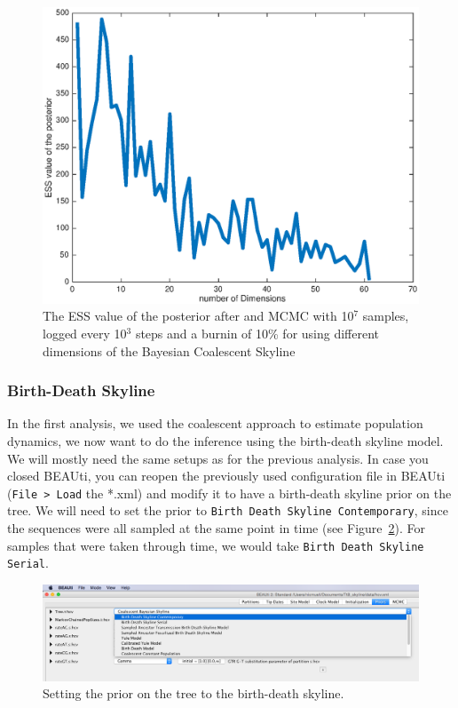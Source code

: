 \documentclass[11pt]{article}
\begin{document}
\begin{figure}[h!]
\centering
\includegraphics[scale=0.5]{figures/ess_vs_dim_coal.eps}
\caption{\small The ESS value of the posterior after and MCMC with 10$^{7}$ samples, logged every 10$^{3}$ steps and a burnin of 10\% for using different dimensions of the Bayesian Coalescent Skyline}
\label{fig:ess}
\end{figure}

\clearpage
\subsubsection{Birth-Death Skyline}
In the first analysis, we used the coalescent approach to estimate population dynamics, we now want to do the inference using the birth-death skyline model. We will mostly need the same setups as for the previous analysis. In case you closed BEAUti, you can reopen the previously used configuration file in BEAUti (\texttt{File > Load} the *.xml) and modify it to have a birth-death skyline prior on the tree. We will need to set the prior to \texttt{Birth Death Skyline Contemporary}, since the sequences were all sampled at the same point in time (see Figure~\ref{fig:bdsky}). For samples that were taken through time, we would take \texttt{Birth Death Skyline Serial}.

\begin{figure}[h!]
\centering
\includegraphics[width=\textwidth]{figures/choose_bdsky.png}
\caption{\small Setting the prior on the tree to the birth-death skyline.}
\label{fig:bdsky}
\end{figure}
\end{document}
